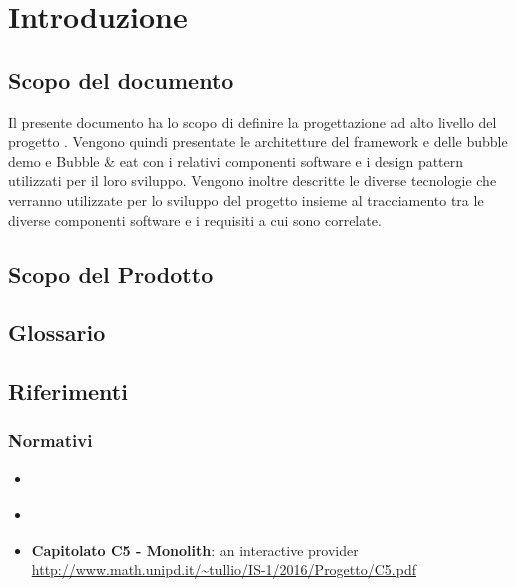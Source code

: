 \section{Introduzione}

\subsection{Scopo del documento}
Il presente documento ha lo scopo di definire la progettazione ad alto livello del progetto \glossario{\ProjectName{}}. Vengono quindi presentate le architetture del framework e delle bubble demo  e Bubble \& eat con i relativi componenti software e i design pattern utilizzati per il loro sviluppo. Vengono inoltre descritte le diverse tecnologie che verranno utilizzate per lo sviluppo del progetto insieme al tracciamento tra le diverse componenti software e i requisiti a cui sono correlate.

\subsection{Scopo del Prodotto}
\ScopoDelProdotto

\subsection{Glossario}
\GlossarioIntroduzione

\subsection{Riferimenti}
\subsubsection{Normativi}
\begin{itemize}
	\item \textbf{\NormeDiProgetto}
	\item \textbf{\AnalisiDeiRequisiti}
	\item \textbf{Capitolato C5 - Monolith}: an interactive provider\\
	 \url{http://www.math.unipd.it/~tullio/IS-1/2016/Progetto/C5.pdf}
\end{itemize}
